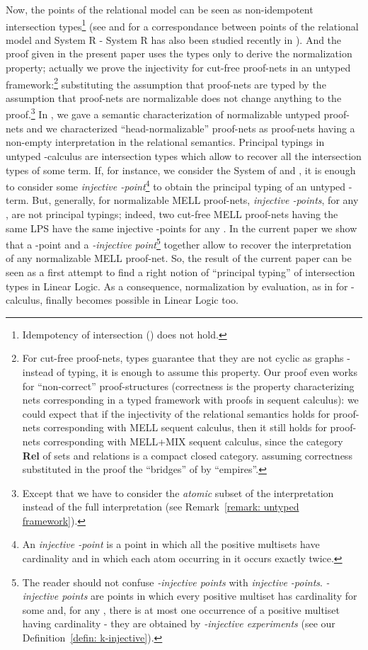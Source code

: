 \documentclass{article}
\theoremstyle{plain}
\begin{document}
Now, the points of the relational model can be seen as non-idempotent intersection types\footnote{Idempotency of intersection () does not hold.}  (see \cite{phddecarvalho} and \cite{Carvalhoexecution} for a correspondance between points of the relational model and System R - System R has also been studied recently in \cite{inhabitation}). And the proof given in the present paper uses the types only to derive the normalization property; actually we prove the injectivity for cut-free proof-nets in an untyped framework:\footnote{For cut-free proof-nets, types guarantee that they are not cyclic as graphs - instead of typing, it is enough to assume this property. Our proof even works for ``non-correct'' proof-structures (correctness is the property characterizing nets corresponding in a typed framework with proofs in sequent calculus): we could expect that if the injectivity of the relational semantics holds for proof-nets corresponding with MELL sequent calculus, then it still holds for proof-nets corresponding with MELL+MIX sequent calculus, since the category \textbf{Rel} of sets and relations is a compact closed category. \cite{k=2} assuming correctness substituted in the proof the ``bridges'' of \cite{LPSinjectivity}  by ``empires''.} substituting the assumption that proof-nets are typed by the assumption that proof-nets are normalizable does not change anything to the proof.\footnote{Except that we have to consider the \emph{atomic} subset of the interpretation instead of the full interpretation (see Remark~\ref{remark: untyped framework}).} 
In \cite{CarvPagTdF10}, we gave a semantic characterization of normalizable untyped proof-nets and we characterized ``head-normalizable'' proof-nets as proof-nets having a non-empty interpretation in the relational semantics. Principal typings in untyped -calculus are intersection types which allow to recover all the intersection types of some term. If, for instance, we consider the System  of \cite{phddecarvalho} and \cite{Carvalhoexecution}, it is enough to consider some \emph{injective -point}\footnote{An \emph{injective -point} is a point in which all the positive multisets have cardinality  and in which each atom occurring in it occurs exactly twice.} to obtain the principal typing of an untyped -term. But, generally, for normalizable MELL proof-nets, \emph{injective -points}, for any , are not principal typings; indeed, two cut-free MELL proof-nets having the same LPS have the same injective -points for any . In the current paper we show that a -point and a \emph{-injective point}\footnote{The reader should not confuse \emph{-injective points} with \emph{injective -points}. \emph{-injective points} are points in which every positive multiset has cardinality  for some  and, for any , there is at most one occurrence of a positive multiset having cardinality  - they are obtained by \emph{-injective experiments} (see our Definition~\ref{defin: k-injective}).} together allow to recover the interpretation of any normalizable MELL proof-net. So, the result of the current paper can be seen as a first attempt to find a right notion of ``principal typing'' of intersection types in Linear Logic. As a consequence, normalization by evaluation, as in \cite{Rocca88} for -calculus, finally becomes possible in Linear Logic too.
\end{document}
